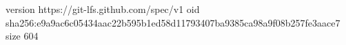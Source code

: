 version https://git-lfs.github.com/spec/v1
oid sha256:e9a9ac6c05434aac22b595b1ed58d11793407ba9385ca98a9f08b257fe3aace7
size 604
